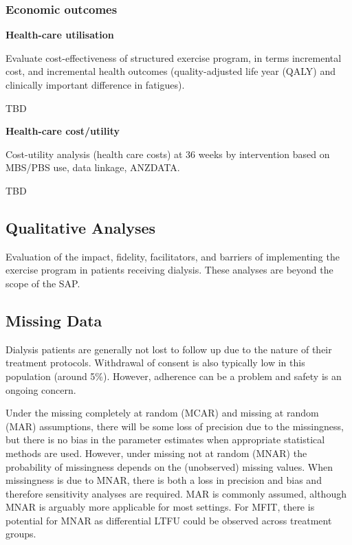 \documentclass[
]{article}
\begin{document}
\hypertarget{economic-outcomes}{%
\subsubsection{Economic outcomes}\label{economic-outcomes}}

\textbf{Health-care utilisation}

Evaluate cost-effectiveness of structured exercise program, in terms incremental cost, and incremental health outcomes (quality-adjusted life year (QALY) and clinically important difference in fatigues).

TBD

\textbf{Health-care cost/utility}

Cost-utility analysis (health care costs) at 36 weeks by intervention based on MBS/PBS use, data linkage, ANZDATA.

TBD



\hypertarget{qualitative-analyses}{%
\subsection{Qualitative Analyses}\label{qualitative-analyses}}

Evaluation of the impact, fidelity, facilitators, and barriers of implementing the exercise program in patients receiving dialysis.
These analyses are beyond the scope of the SAP.

\hypertarget{missing-data}{%
\subsection{Missing Data}\label{missing-data}}

Dialysis patients are generally not lost to follow up due to the nature of their treatment protocols.
Withdrawal of consent is also typically low in this population (around 5\%).
However, adherence can be a problem and safety is an ongoing concern.

Under the missing completely at random (MCAR) and missing at random (MAR) assumptions, there will be some loss of precision due to the missingness, but there is no bias in the parameter estimates when appropriate statistical methods are used.
However, under missing not at random (MNAR) the probability of missingness depends on the (unobserved) missing values.
When missingness is due to MNAR, there is both a loss in precision and bias and therefore sensitivity analyses are required.
MAR is commonly assumed, although MNAR is arguably more applicable for most settings.
For MFIT, there is potential for MNAR as differential LTFU could be observed across treatment groups.
\end{document}
